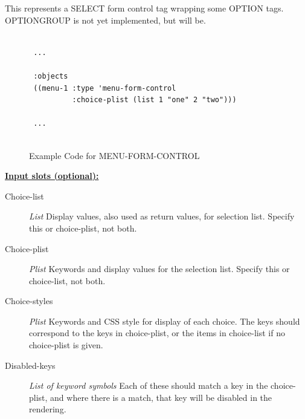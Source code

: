 \documentclass [11pt]{book}
\begin{document}
\begin{itemize}
\begin{description}
This represents a SELECT form control tag wrapping some OPTION tags.
OPTIONGROUP is not yet implemented, but will be.



\end{description}




\begin{figure}
\begin{lrbox}{\boxedverb}
\begin{minipage}{\linewidth}
{\small

\begin{verbatim}

 ...
 
 :objects
 ((menu-1 :type 'menu-form-control
          :choice-plist (list 1 "one" 2 "two")))

 ...


\end{verbatim}}
\end{minipage}
\end{lrbox}
\fbox{\usebox{\boxedverb}}

\caption{Example Code for MENU-FORM-CONTROL}

\label{fig:example-code-MENU-FORM-CONTROL}

\end{figure}





\textbf{
\underline{Input slots (optional):}}

\begin{description}

\item [Choice-list]
\emph{List} Display values, also used as return values, for selection list. Specify this or choice-plist, not both.


\item [Choice-plist]
\emph{Plist} Keywords and display values for the selection list. Specify this or choice-list, not both.


\item [Choice-styles]
\emph{Plist} Keywords and CSS style for display of each choice. The keys should correspond to the
keys in choice-plist, or the items in choice-list if no choice-plist is given.


\item [Disabled-keys]
\emph{List of keyword symbols} Each of these should match a key in the choice-plist, and where there is a
match, that key will be disabled in the rendering.



\end{description}
\end{itemize}
\end{document}
